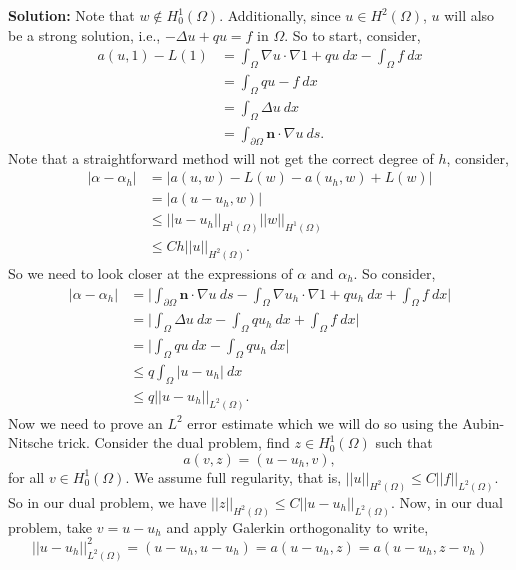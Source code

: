 \documentclass[11pt]{article}
\begin{document}
\vskip 1cm


\textbf{Solution:} Note that $w \not \in H^1_0(\Omega)$. 
Additionally, since $u \in H^2(\Omega)$, $u$ will also be a strong solution, i.e., $-\Delta u + qu = f$ in $\Omega$.
So to start, consider,
\begin{align*}
    a(u,1) - L(1) &= \int_{\Omega} \nabla u \cdot \nabla 1 + qu \: dx - \int_\Omega f  \: dx \\
    &= \int_\Omega qu - f \: dx \\
    &= \int_\Omega \Delta u \: dx  \\
    &= \int_{\partial \Omega} \mathbf{n} \cdot \nabla u \: ds.
\end{align*}
Note that a straightforward method will not get the correct degree of $h$, consider,
\begin{align*}
    |\alpha - \alpha_h| &= |a(u,w) - L(w) - a(u_h, w) + L(w)| \\
    &= |a(u-u_h, w)| \\
    &\leq ||u - u_h||_{H^1(\Omega)} ||w||_{H^1(\Omega)} \\
    &\leq C h ||u||_{H^2(\Omega)}.
\end{align*}
So we need to look closer at the expressions of $\alpha$ and $\alpha_h$.
So consider,
\begin{align*}
    |\alpha - \alpha_h| &= \Big| \int_{\partial \Omega} \mathbf{n} \cdot \nabla u \: ds - \int_\Omega \nabla u_h \cdot \nabla 1 + q u_h \: dx + \int_\Omega f \: dx \Big| \\
    &= \Big| \int_\Omega \Delta u \: dx - \int_\Omega  q u_h  \: dx + \int_\Omega f  \: dx \Big| \\
    &= \Big|\int_\Omega qu \: dx - \int_\Omega q u_h \: dx \Big| \\
    &\leq 
    q \int_\Omega |u - u_h| \: dx \\
    &\leq q ||u - u_h||_{L^2(\Omega)}.
\end{align*}
Now we need to prove an $L^2$ error estimate which we will do so using the Aubin-Nitsche trick. 
Consider the dual problem, find $z \in H^1_0(\Omega)$ such that 
\begin{equation*}
    a(v,z) = (u - u_h, v),
\end{equation*}
for all $v \in H^1_0(\Omega)$.
We assume full regularity, that is, $||u||_{H^2(\Omega)} \leq C ||f||_{L^2(\Omega)}$.
So in our dual problem, we have $||z||_{H^2(\Omega)} \leq C ||u - u_h||_{L^2(\Omega)}$.
Now, in our dual problem, take $v = u - u_h$ and apply Galerkin orthogonality to write,
\begin{equation*}
    ||u - u_h||^2_{L^2(\Omega)} = (u- u_h, u - u_h) = a(u - u_h, z) = a(u - u_h, z - v_h)
\end{equation*}
\end{document}
